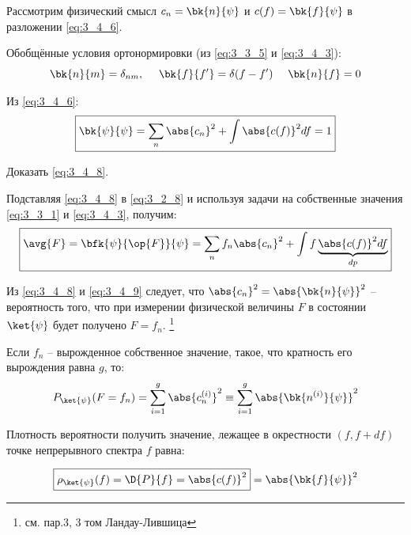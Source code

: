 Рассмотрим физический смысл $c_n = \bk{n}{\psi}$ и $c(f) = \bk{f}{\psi}$ в разложении \eqref{eq:3_4_6}.

Обобщённые условия ортонормировки (из \eqref{eq:3_3_5} и \eqref{eq:3_4_3}):
$$
\bk{n}{m} = \delta_{nm}, ~~~~ \bk{f}{f'} = \delta(f - f') ~~~~ \bk{n}{f} = 0
$$

Из \eqref{eq:3_4_6}:
\begin{equation}
\label{eq:3_4_8}
\boxed {
	\bk{\psi}{\psi} = \sum_n \abs{c_n}^2 + \int \abs{c(f)}^2 df = 1
}
\end{equation}

\begin{excr}
Доказать \eqref{eq:3_4_8}.
\end{excr}

Подставляя \eqref{eq:3_4_8} в \eqref{eq:3_2_8} и используя задачи на собственные значения \eqref{eq:3_3_1} и \eqref{eq:3_4_3}, получим:
\begin{equation}
\label{eq:3_4_9}
\boxed {
	\avg{F} = \bfk{\psi}{\op{F}}{\psi} = \sum_n f_n \abs{c_n}^2 + \int f \underbrace{\abs{c(f)}^2 df}_{dp}
}
\end{equation}

Из \eqref{eq:3_4_8} и \eqref{eq:3_4_9} следует, что $\abs{c_n}^2 = \abs{\bk{n}{\psi}}^2$ -- вероятность того, что при измерении физической величины $F$ в состоянии $\ket{\psi}$ будет получено $F = f_n$. \footnote{см. пар.3, 3 том Ландау-Лившица}

Если $f_n$ -- вырожденное собственное значение, такое, что кратность его вырождения равна $g$, то:
\begin{equation}
\label{eq:3_4_10}
P_{\ket{\psi}}(F = f_n) = \sum_{i=1}^{g} \abs{c_n^{(i)}}^2 \equiv \sum_{i=1}^{g} \abs{ \bk{n^{(i)}}{\psi} }^2
\end{equation}

Плотность вероятности получить значение, лежащее в окрестности $(f, f + df)$ точке непрерывного спектра $f$ равна:

\begin{equation}
\label{eq:3_4_11}
\boxed {
	\rho_{\ket{\psi}}(f) = \D{P}{f} = \abs{c(f)}^2
} = \abs{\bk{f}{\psi}}^2
\end{equation}
